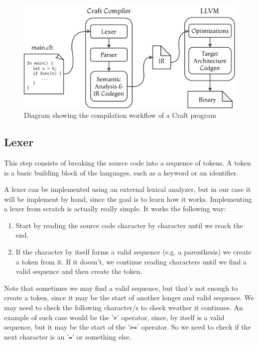 ﻿\documentclass[10pt,a4paper,twocolumn,twoside]{article}
\begin{document}
\begin{figure}[ht]
\centering
\captionsetup{justification=centering,margin=1cm}
\includegraphics[width=\linewidth]{arch}
\caption{Diagram showing the compilation workflow of a Craft program}
\end{figure}

\subsection{Lexer} 
This step consists of breaking the source code into a sequence of tokens. A
token is a basic building block of the languages, such as a keyword or an
identifier.

A lexer can be implemented using an external lexical analyzer, but in our case
it will be implement by hand, since the goal is to learn how it works. 
Implementing a lexer from scratch is actually really simple. It works the 
following way:

\begin{enumerate}
    \item Start by reading the source code character by character until we reach
        the end.
    \item If the character by itself forms a valid sequence (e.g. a parenthesis)
        we create a token from it. If it doesn't, we continue reading characters
        until we find a valid sequence and then create the token.
\end{enumerate}

Note that sometimes we may find a valid sequence, but that's not enough to
create a token, since it may be the start of another longer and valid sequence.
We may need to check the following character/s to check weather it continues. An
example of such case would be the '\texttt{>}' operator, since, by itself is a
valid sequence, but it may be the start of the '\texttt{>=}' operator. So we
need to check if the next character is an '\texttt{=}' or something else.
\end{document}
